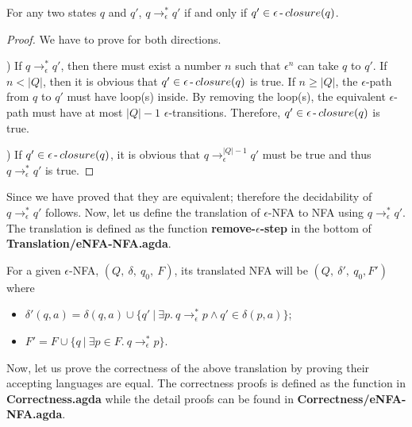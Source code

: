 \begin{lem}
\noindent For any two states \(q\) and \(q'\), \(q \to_\epsilon^* q'\)
if and only if \(q' \in \epsilon\operatorname{-} closure(q)\). 
\end{lem}

\begin{proof}
\noindent We have to prove for both directions. 
\par {}) If \(q \to_\epsilon^* q'\), then there must exist a
number \(n\) such that \(\epsilon^n\) can take \(q\) to \(q'\). If
\(n < |Q|\), then it is obvious that \(q' \in
\epsilon\operatorname{-} closure(q)\) is true. If \(n \geq |Q|\), the
\(\epsilon\)-path from \(q\) to \(q'\) must have loop(s) inside. By
removing the loop(s), the equivalent \(\epsilon\)-path must have at
most \(|Q|-1\) \(\epsilon\)-transitions. Therefore, \(q' \in
\epsilon\operatorname{-} closure(q)\) is true. 

\par {}) If \(q' \in \epsilon\operatorname{-} closure(q)\), it is obvious
that \(q \to_\epsilon^{|Q|-1} q'\) must be true and thus \(q
\to_\epsilon^* q'\) is true. 
\end{proof}

\par Since we have proved that they are equivalent; therefore the
decidability of \(q \to_\epsilon^* q'\) follows. Now, let us define
the translation of \(\epsilon\)-NFA to NFA using \(q \to_\epsilon^*
q'\). The translation is defined as the function
\textbf{remove-\(\epsilon\)-step} in the bottom of
\textbf{Translation/eNFA-NFA.agda}. 
 
\begin{defn}
\label{defn:remove_epsilon}
\noindent For a given \(\epsilon\)-NFA, \((Q,\ \delta,\
q_0,\ F)\), its translated NFA will be \((Q,\ \delta',\ q_0,
F')\) where
\begin{itemize}[nolistsep]
  \item \(\delta'(q,a) = \delta (q,a) \cup \{q'\ |\ \exists p.\
      q \to_\epsilon^* p \wedge q' \in \delta (p,a)\}\);
  \item \(F' = F \cup \{q\ |\ \exists p\in F.\ q \to_\epsilon^* p\}
    \). 
\end{itemize}
\end{defn}

\par Now, let us prove the correctness of the above translation by proving their accepting languages
are equal. The correctness proofs is defined as the function
\mmb{L^{eN} \!\approx\! L^N} in \textbf{Correctness.agda} while the
detail proofs can be found in \textbf{Correctness/eNFA-NFA.agda}.

